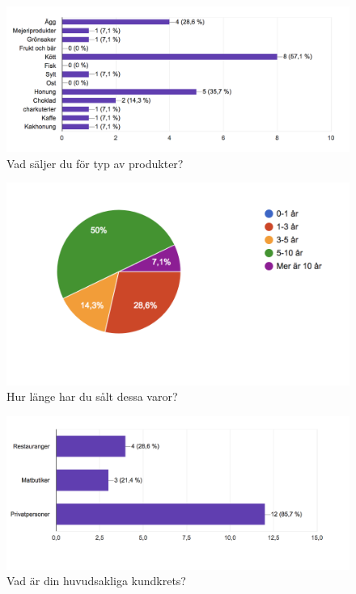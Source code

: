 \documentclass[10pt,a4paper,oneside]{article}
\begin{document}


\newpage


\begin{figure}
	\includegraphics[scale=0.6]{1.png}
	\caption{Vad s\"aljer du f\"or typ av produkter?}
\end{figure}

\begin{figure}
	\includegraphics[scale=0.6]{2.png}
	\caption{Hur l\"ange har du s\r{a}lt dessa varor?}
\end{figure}

\begin{figure}
	\includegraphics[scale=0.6]{3.png}
	\caption{Vad \"ar din huvudsakliga kundkrets?}
\end{figure}
\end{document}
